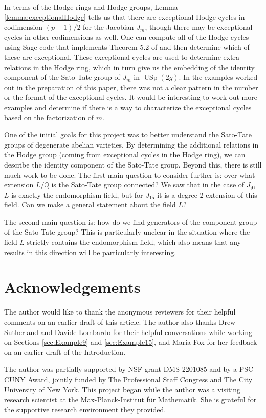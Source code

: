 \documentclass[reqno, oneside, 12pt]{amsart}
\DeclareMathOperator{\USp}{USp}
\newcommand{\Q}{\mathbb{Q}}
\theoremstyle{remark}
\numberwithin{equation}{section}
\begin{document}
In terms of the Hodge rings and Hodge groups,  Lemma \ref{lemma:exceptionalHodge} tells us that there are exceptional Hodge cycles in codimension $(p+1)/2$ for the Jacobian $J_m$, though there may be exceptional cycles in other codimensions as well. One can compute all of the Hodge cycles using Sage code that implements Theorem 5.2 of \cite{Shioda82} and then determine which of these are exceptional. These exceptional cycles are used to determine extra relations in the Hodge ring, which in turn give us the embedding of the identity component of the Sato-Tate group of $J_m$ in $\USp(2g)$. In the examples worked out in the preparation of this paper, there was not a clear pattern in the number or the format of the exceptional cycles. It would be interesting to work out more examples and determine if there is a way to characterize the exceptional cycles based on the factorization of $m$.

One of the initial goals for this project was to better understand the Sato-Tate groups of degenerate abelian varieties. By determining the additional relations in the Hodge group (coming from exceptional cycles in the Hodge ring), we can describe the identity component of the Sato-Tate group. Beyond this, there is still much work to be done. The first main question to consider further is: over what extension $L/\Q$ is the Sato-Tate group connected? We saw that in the case of $J_9$, $L$ is exactly the endomorphism field, but for $J_{15}$ it is a degree 2 extension of this field. Can we make a general statement about the field $L$?

The second main question is: how do we find generators of the component group of the Sato-Tate group? This is particularly unclear in the situation where the field $L$ strictly contains the endomorphism field, which also means that any results in this direction will be particularly interesting. 





\section*{Acknowledgements}
The author would like to thank the anonymous reviewers for their helpful comments on an earlier draft of this article. The author also thanks Drew Sutherland and Davide Lombardo for their helpful conversations while working on Sections \ref{sec:Example9} and \ref{sec:Example15}, and Maria Fox for her feedback on an earlier draft of the Introduction.

The author was partially supported by NSF grant DMS-2201085 and by a PSC-CUNY Award, jointly funded by The Professional Staff Congress and The City University of New York. This project began while the author was a visiting research scientist at the Max-Planck-Institut f\"ur Mathematik. She is grateful for the supportive research environment they provided. 





\end{document}
